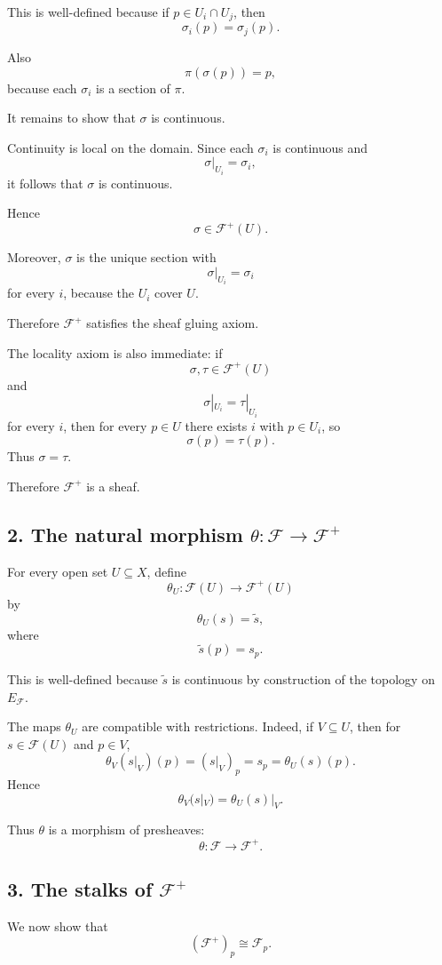 \documentclass[12pt,a4paper]{article}
\begin{document}
This is well-defined because if $p \in U_i \cap U_j$, then
\[
\sigma_i(p) = \sigma_j(p).
\]

Also
\[
\pi(\sigma(p)) = p,
\]
because each $\sigma_i$ is a section of $\pi$.

It remains to show that $\sigma$ is continuous.

Continuity is local on the domain. Since each $\sigma_i$ is continuous and
\[
\sigma|_{U_i} = \sigma_i,
\]
it follows that $\sigma$ is continuous.

Hence
\[
\sigma \in \mathcal F^+(U).
\]

Moreover, $\sigma$ is the unique section with
\[
\sigma|_{U_i} = \sigma_i
\]
for every $i$, because the $U_i$ cover $U$.

Therefore $\mathcal F^+$ satisfies the sheaf gluing axiom.

The locality axiom is also immediate: if
\[
\sigma,\tau \in \mathcal F^+(U)
\]
and
\[
\sigma|_{U_i} = \tau|_{U_i}
\]
for every $i$, then for every $p \in U$ there exists $i$ with $p \in U_i$,
so
\[
\sigma(p) = \tau(p).
\]
Thus $\sigma=\tau$.

Therefore $\mathcal F^+$ is a sheaf.

\subsection*{2. The natural morphism $\theta : \mathcal F \to \mathcal F^+$}

For every open set $U \subseteq X$, define
\[
\theta_U : \mathcal F(U) \longrightarrow \mathcal F^+(U)
\]
by
\[
\theta_U(s) = \widetilde{s},
\]
where
\[
\widetilde{s}(p) = s_p.
\]

This is well-defined because $\widetilde{s}$ is continuous by construction of
the topology on $E_{\mathcal F}$.

The maps $\theta_U$ are compatible with restrictions. Indeed, if
$V \subseteq U$, then for $s \in \mathcal F(U)$ and $p \in V$,
\[
\theta_V(s|_V)(p)
=
(s|_V)_p
=
s_p
=
\theta_U(s)(p).
\]
Hence
\[
\theta_V(s|_V)
=
\theta_U(s)|_V.
\]

Thus $\theta$ is a morphism of presheaves:
\[
\theta : \mathcal F \longrightarrow \mathcal F^+.
\]

\subsection*{3. The stalks of $\mathcal F^+$}

We now show that
\[
(\mathcal F^+)_p \cong \mathcal F_p.
\]
\end{document}
